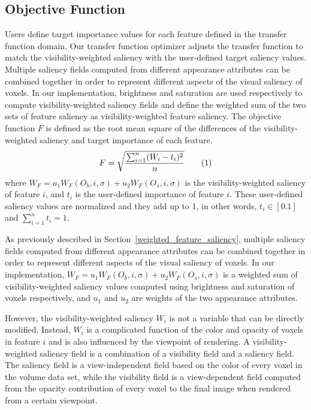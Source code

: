 
\subsection{Objective Function}
Users define target importance values for each feature defined in the transfer function domain.
Our transfer function optimizer adjusts the transfer function to match the visibility-weighted saliency with the user-defined target saliency values.
Multiple saliency fields computed from different appearance attributes can be combined together in order to represent different aspects of the visual saliency of voxels.
In our implementation, brightness and saturation are used respectively to compute visibility-weighted saliency fields and define the weighted sum of the two sets of feature saliency as visibility-weighted feature saliency.
The objective function $ F $ is defined as the root mean square of the differences of the visibility-weighted saliency and target importance of each feature.
\[ F=\sqrt{ \frac{\sum_{i=1}^{n} (W_{i}-t_{i})^{2}}{n} } 
\addtag \]
where $ W_{F}=u_{1}W_{F}(O_{b},i,\sigma)+u_{2}W_{F}(O_{s},i,\sigma) $ is the visibility-weighted saliency of feature $ i $, and $ t_{i} $ is the user-defined importance of feature $ i $. These user-defined saliency values are normalized and they add up to 1, in other words, $ t_{i} \in [0.1] $ and $ \sum_{i=1}^{n} t_{i} = 1 $.

As previously described in Section~\ref{weighted_feature_saliency}, multiple saliency fields computed from different appearance attributes can be combined together in order to represent different aspects of the visual saliency of voxels.
In our implementation, $ W_{F}=u_{1}W_{F}(O_{b},i,\sigma)+u_{2}W_{F}(O_{s},i,\sigma) $ is a weighted sum of visibility-weighted saliency values computed using brightness and saturation of voxels respectively, and $ u_{1} $ and $ u_{2} $ are weights of the two appearance attributes.

However, the visibility-weighted saliency $ W_{i} $ is not a variable that can be directly modified. Instead, $ W_{i} $ is a complicated function of the color and opacity of voxels in feature $ i $ and is also influenced by the viewpoint of rendering. A visibility-weighted saliency field is a combination of a visibility field and a saliency field. The saliency field is a view-independent field based on the color of every voxel in the volume data set, while the visibility field is a view-dependent field computed from the opacity contribution of every voxel to the final image when rendered from a certain viewpoint.

